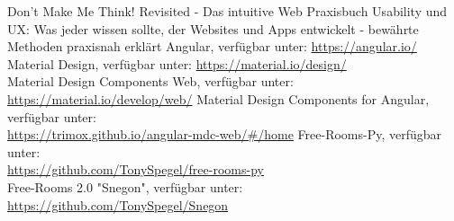\raggedright
\begin{thebibliography}{xxxxxxxxxxxxxxxxxxxxxxxxxxxxxxxxxxxx}
     Don't Make Me Think! Revisited - Das intuitive Web
     Praxisbuch Usability und UX: Was jeder wissen sollte,
        der Websites und Apps entwickelt - bewährte Methoden praxisnah erklärt
     Angular,
        verfügbar unter: \url{https://angular.io/}\\

        Material Design,
        verfügbar unter: \url{https://material.io/design/}\\

        Material Design Components Web,
        verfügbar unter: \url{https://material.io/develop/web/}
     Material Design Components for Angular,
        verfügbar unter:\\ \url{https://trimox.github.io/angular-mdc-web/#/home}
     Free-Rooms-Py,
        verfügbar unter:\\ \url{https://github.com/TonySpegel/free-rooms-py}\\

        Free-Rooms 2.0 "Snegon",
        verfügbar unter: \url{https://github.com/TonySpegel/Snegon}
\end{thebibliography}
